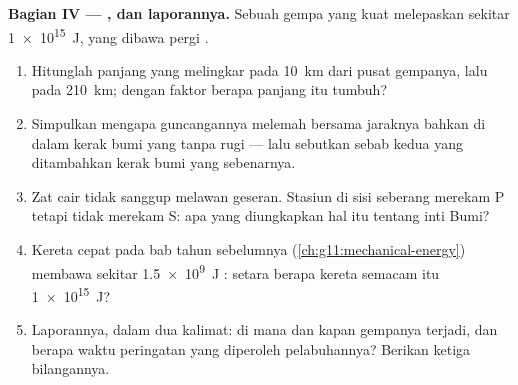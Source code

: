 \begin{problem}
\medskip
\noindent\textbf{Bagian IV --- , dan laporannya.}
Sebuah gempa yang kuat melepaskan sekitar \qty{1e15}{J}, yang dibawa
pergi .
\begin{enumerate}[resume]
  \item Hitunglah panjang  yang melingkar pada
        \qty{10}{km} dari pusat gempanya, lalu pada \qty{210}{km};
        dengan faktor berapa panjang itu tumbuh?
  \item Simpulkan mengapa guncangannya melemah bersama jaraknya bahkan
        di dalam kerak bumi yang tanpa rugi --- lalu sebutkan sebab
        kedua yang ditambahkan kerak bumi yang sebenarnya.
  \item Zat cair tidak sanggup melawan geseran. Stasiun di sisi
        seberang merekam  P tetapi tidak merekam  S:
        apa yang diungkapkan hal itu tentang inti Bumi?
  \item Kereta cepat pada bab  tahun sebelumnya
        (\cref{ch:g11:mechanical-energy}) membawa sekitar \qty{1.5e9}{J}
        : setara berapa kereta semacam itu \qty{1e15}{J}?
  \item Laporannya, dalam dua kalimat: di mana dan kapan gempanya
        terjadi, dan berapa waktu peringatan yang diperoleh
        pelabuhannya? Berikan ketiga bilangannya.
\end{enumerate}
\end{problem}
